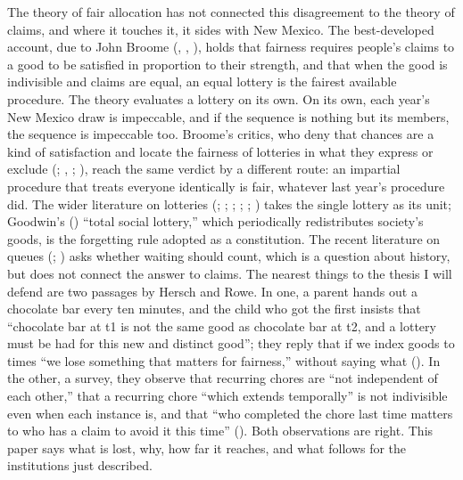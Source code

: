 \documentclass[
  11pt,
  letterpaper,
  DIV=11,
  numbers=noendperiod,
  twoside]{scrartcl}
\begin{document}
The theory of fair allocation has not connected this disagreement to the
theory of claims, and where it touches it, it sides with New Mexico. The
best-developed account, due to John Broome
(, ,
), holds that fairness requires people's
claims to a good to be satisfied in proportion to their strength, and
that when the good is indivisible and claims are equal, an equal lottery
is the fairest available procedure. The theory evaluates a lottery on
its own. On its own, each year's New Mexico draw is impeccable, and if
the sequence is nothing but its members, the sequence is impeccable too.
Broome's critics, who deny that chances are a kind of satisfaction and
locate the fairness of lotteries in what they express or exclude
(;
, ;
), reach the same
verdict by a different route: an impartial procedure that treats
everyone identically is fair, whatever last year's procedure did. The
wider literature on lotteries (;
;
;
;
;
) takes the single lottery as its
unit; Goodwin's () ``total social
lottery,'' which periodically redistributes society's goods, is the
forgetting rule adopted as a constitution. The recent literature on
queues (;
) asks whether
waiting should count, which is a question about history, but does not
connect the answer to claims. The nearest things to the thesis I will
defend are two passages by Hersch and Rowe. In one, a parent hands out a
chocolate bar every ten minutes, and the child who got the first insists
that ``chocolate bar at t1 is not the same good as chocolate bar at t2,
and a lottery must be had for this new and distinct good''; they reply
that if we index goods to times ``we lose something that matters for
fairness,'' without saying what (). In the other, a survey, they observe that
recurring chores are ``not independent of each other,'' that a recurring
chore ``which extends temporally'' is not indivisible even when each
instance is, and that ``who completed the chore last time matters to who
has a claim to avoid it this time''
(). Both
observations are right. This paper says what is lost, why, how far it
reaches, and what follows for the institutions just described.
\end{document}
